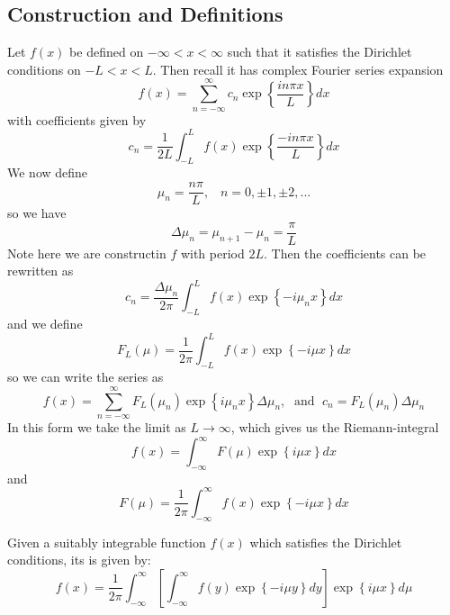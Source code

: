 \documentclass[12pt, a4paper, oneside, openright, titlepage]{book}
\begin{document}
\subsection{Construction and Definitions}

Let $f(x)$ be defined on $-\infty < x < \infty$ such that it satisfies the Dirichlet conditions on $-L < x < L$. Then recall it has complex Fourier series expansion \begin{equation*}
    f(x) = \sum_{n=-\infty}^{\infty}c_n\exp\left\{\frac{in\pi x}{L}\right\}dx
\end{equation*}
with coefficients given by \begin{equation*}
    c_n = \frac{1}{2L}\int_{-L}^Lf(x)\exp\left\{\frac{-in\pi x}{L}\right\}dx
\end{equation*}
We now define \begin{equation*}
    \mu_n = \frac{n\pi}{L},\;\;\;n=0,\pm1,\pm2,...
\end{equation*}
so we have \begin{equation*}
    \Delta \mu_n = \mu_{n+1}-\mu_n = \frac{\pi}{L}
\end{equation*}
Note here we are constructin $f$ with period $2L$. Then the coefficients can be rewritten as \begin{equation*}
    c_n = \frac{\Delta\mu_n}{2\pi}\int_{-L}^Lf(x)\exp\left\{-i\mu_nx\right\}dx
\end{equation*}
and we define \begin{equation*}
    F_L(\mu) = \frac{1}{2\pi}\int_{-L}^Lf(x)\exp\left\{-i\mu x\right\}dx
\end{equation*}
so we can write the series as \begin{equation*}
    f(x) = \sum_{n=-\infty}^{\infty}F_L(\mu_n)\exp\left\{i\mu_nx\right\}\Delta \mu_n,\;\text{ and }\;c_n = F_L(\mu_n)\Delta \mu_n
\end{equation*}
In this form we take the limit as $L\rightarrow \infty$, which gives us the Riemann-integral \begin{equation}
    \boxed{f(x) = \int_{-\infty}^{\infty}F(\mu)\exp\left\{i\mu x\right\}dx}
\end{equation}
and \begin{equation}
    \boxed{F(\mu) = \frac{1}{2\pi}\int_{-\infty}^{\infty}f(x)\exp\left\{-i\mu x\right\}dx}
\end{equation}

\begin{thm}
    Given a suitably integrable function $f(x)$ which satisfies the Dirichlet conditions, its  is given by: \begin{equation}
        f(x) = \frac{1}{2\pi}\int_{-\infty}^{\infty}\left[\int_{-\infty}^{\infty}f(y)\exp\left\{-i\mu y\right\}dy\right]\exp\left\{i\mu x\right\}d\mu
    \end{equation}
\end{thm}
\end{document}
